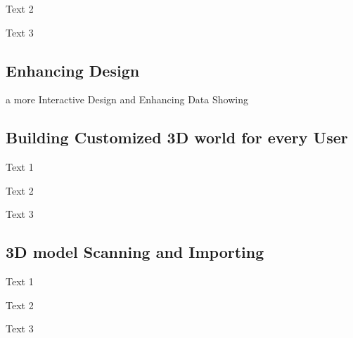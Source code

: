 Text 2

Text 3

\subsection{Enhancing Design }\label{sec:f2.3}
a more Interactive Design and Enhancing Data Showing

\subsection{Building Customized 3D world for every User}\label{sec:f2.4}
Text 1

Text 2

Text 3

\subsection{3D model Scanning and Importing}\label{sec:f2.5}
Text 1

Text 2

Text 3
